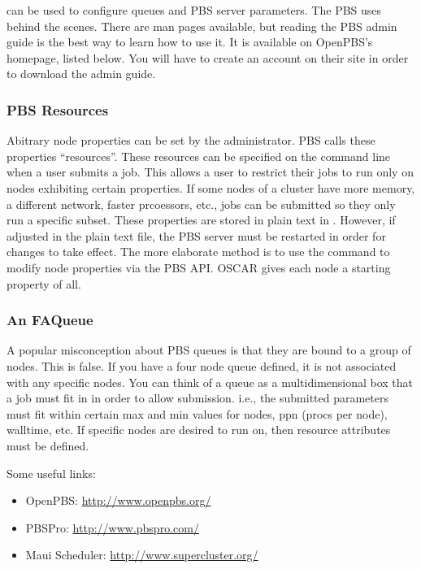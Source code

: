  can be used to configure queues and PBS server parameters.
The PBS  uses  behind the scenes.  There
are man pages available, but reading the PBS admin guide is the best
way to learn how to use it.  It is available on OpenPBS's homepage,
listed below.  You will have to create an account on their site in
order to download the admin guide.

\subsubsection{PBS Resources}

Abitrary node properties can be set by the administrator.  PBS calls
these properties ``resources''.  These resources can be specified on
the  command line when a user submits a job.  This allows a
user to restrict their jobs to run only on nodes exhibiting certain
properties.  If some nodes of a cluster have more memory, a different
network, faster prcoessors, etc., jobs can be submitted so they only
run a specific subset.  These properties are stored in plain text in
.  However, if adjusted in the
plain text file, the PBS server must be restarted in order for changes
to take effect.  The more elaborate method is to use the 
command to modify node properties via the PBS API.  OSCAR gives each
node a starting property of {all}.

\subsubsection{An FAQueue}

A popular misconception about PBS queues is that they are bound to a
group of nodes.  This is false.  If you have a four node queue
defined, it is not associated with any specific nodes.  You can think
of a queue as a multidimensional box that a job must fit in in order
to allow submission.  i.e., the submitted parameters must fit within
certain max and min values for nodes, ppn (procs per node), walltime,
etc.  If specific nodes are desired to run on, then resource
attributes must be defined.

Some useful links:

\begin{itemize}
\item OpenPBS: \url{http://www.openpbs.org/}

\item PBSPro: \url{http://www.pbspro.com/}

\item Maui Scheduler: \url{http://www.supercluster.org/}
\end{itemize}


